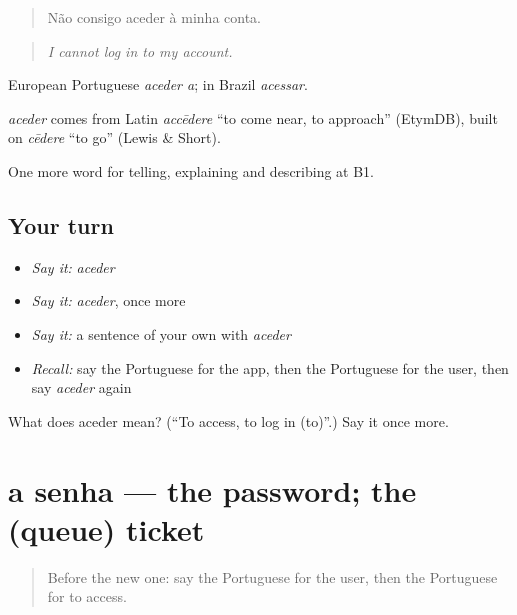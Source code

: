 \begin{quote}
Não consigo aceder à minha conta.
\end{quote}

\begin{quote}
\emph{I cannot log in to my account.}
\end{quote}

European Portuguese \emph{aceder a}; in Brazil \emph{acessar}.

\begin{cousinweb}
\emph{aceder} comes from Latin \emph{accēdere} \textquotedblleft{}to come near, to approach\textquotedblright{} (EtymDB), built on \emph{cēdere} \textquotedblleft{}to go\textquotedblright{} (Lewis \& Short).
\end{cousinweb}

\begin{grammarlens}[title={What you've built}]
One more word for telling, explaining and describing at B1.
\end{grammarlens}

\subsection*{Your turn}
\begin{itemize}
\raggedright
  \item \emph{Say it:} \emph{aceder}
  \item \emph{Say it:} \emph{aceder}, once more
  \item \emph{Say it:} a sentence of your own with \emph{aceder}
  \item \emph{Recall:} say the Portuguese for the app, then the Portuguese for the user, then say \emph{aceder} again
\end{itemize}

\begin{tcolorbox}[breakable,colback=teal!4,colframe=teal!35!black,title={Before you move on}]
What does aceder mean? (\textquotedblleft{}To access, to log in (to)\textquotedblright{}.) Say it once more.
\end{tcolorbox}
\section[a senha]{a senha — the password; the (queue) ticket}

\label{lesson:PT-C396-senha}



\begin{quote}
Before the new one: say the Portuguese for the user, then the Portuguese for to access.
\end{quote}

